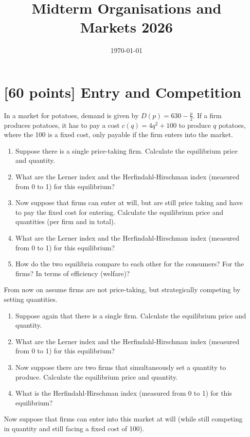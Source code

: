 \documentclass{article}
\title{Midterm Organisations and Markets 2026}
\author{}
\date{\today}
\begin{document}
\maketitle

\section{[60 points] Entry and Competition}
In a market for potatoes, demand is given by $D(p)=630-\frac p2$. If a firm produces potatoes, it has to pay a cost $c(q)=4q^{2}+100$ to produce $q$ potatoes, where the 100 is a fixed cost, only payable if the firm enters into the market.

\begin{enumerate}[label=(\alph*)]
\item Suppose there is a single price-taking firm. Calculate the equilibrium price and quantity.
\item What are the Lerner index and the Herfindahl-Hirschman index (measured from 0 to 1) for this equilibrium?
\item Now suppose that firms can enter at will, but are still price taking and have to pay the fixed cost for entering. Calculate the equilibrium price and quantities (per firm and in total).
\item What are the Lerner index and the Herfindahl-Hirschman index (measured from 0 to 1) for this equilibrium?
  \item How do the two equilibria compare to each other for the consumers? For the firms? In terms of efficiency (welfare)?
\end{enumerate}

From now on assume firms are not price-taking, but strategically competing by setting quantities.

\begin{enumerate}[resume*]
\item Suppose again that there is a single firm. Calculate the equilibrium price and quantity.
\item What are the Lerner index and the Herfindahl-Hirschman index (measured from 0 to 1) for this equilibrium?
\item Now suppose there are two firms that simultaneously set a quantity to produce. Calculate the equilibrium price and quantity.
\item What is the Herfindahl-Hirschman index (measured from 0 to 1) for this equilibrium?
\end{enumerate}

Now suppose that firms can enter into this market at will (while still competing in quantity and still facing a fixed cost of 100).
\end{document}
